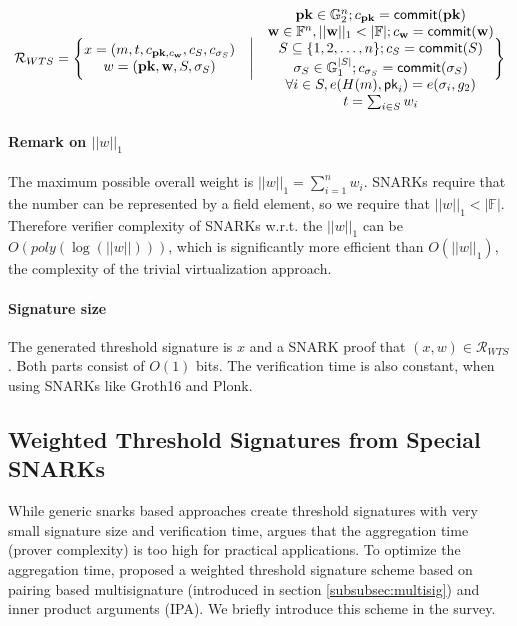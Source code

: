 \begin{equation*}
    \mathcal{R}_{WTS} = 
\Bigg\{\space \begin{matrix}
         x = (m, t, c_{\mathbf{pk}, c_{\mathbf{w}}}, c_{S}, c_{\sigma_{S}})\\
         w = (\mathbf{pk}, \mathbf{w}, S, \sigma_S)\\
    \end{matrix}\quad \Bigg| \quad \begin{matrix}
        \mathbf{pk}\in \mathbb{G}_2^n; c_{\mathbf{pk}} = \mathsf{commit}(\mathbf{pk})\\
        \mathbf{w}\in \mathbb{F}^n, ||\mathbf{w}||_1<|\mathbb{F}|;  c_{\mathbf{w}} = \mathsf{commit}(\mathbf{w})\\
        S\subseteq \{1,2,\dots, n\}; c_{S} = \mathsf{commit}(S)\\
        \sigma_{S} \in \mathbb{G}_1^{|S|} ;c_{\sigma_{S}} = \mathsf{commit}(\sigma_S) \\
        \forall i\in S, e(H(m), \mathsf{pk}_i) = e(\sigma_i, g_2) \\
        t = \sum_{i\in S} w_i  \\
    \end{matrix}\space \Bigg\}
\end{equation*}

\paragraph{Remark on $||w||_1$} The maximum possible overall weight is $||w||_1 = \sum_{i=1}^n w_i$. SNARKs require that the number can be represented by a field element, so we require that $||w||_1<|\mathbb{F}|$. Therefore verifier complexity of SNARKs w.r.t. the $||w||_1$ can be $O(poly(\log(||w||)))$, which is significantly more efficient than $O(||w||_1)$, the complexity of the trivial virtualization approach. 

\paragraph{Signature size} The generated threshold signature is $x$ and a SNARK proof that $(x,w)\in \mathcal{R}_{WTS}$. Both parts consist of $O(1)$ bits. The verification time is also constant, when using SNARKs like Groth16 and Plonk. 

\subsection{Weighted Threshold Signatures from Special SNARKs}
While generic snarks based approaches create threshold signatures with very small signature size and verification time, \cite{DBLP:conf/ccs/DasCXNB023} argues that the aggregation time (prover complexity) is too high for practical applications. To optimize the aggregation time, \cite{DBLP:conf/ccs/DasCXNB023} proposed a weighted threshold signature scheme based on pairing based multisignature (introduced in section \ref{subsubsec:multisig}) and inner product arguments (IPA). We briefly introduce this scheme in the survey. 

